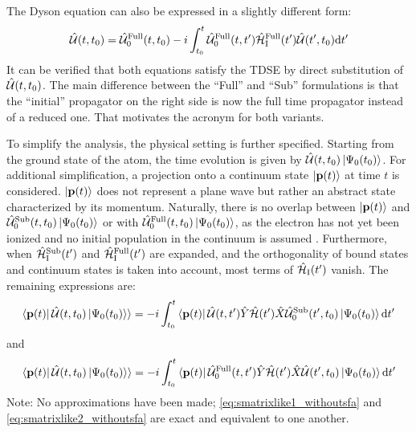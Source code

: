 The Dyson equation can also be expressed in a slightly different form:
\begin{equation}
    \hat{\mathcal{U}}(t,t_0)=\hat{\mathcal{U}}^{\mathrm{Full}}_0(t,t_0)-i\int_{t_0}^{t} \hat{\mathcal{U}}^{\mathrm{Full}}_0(t,t')\hat{\mathcal{H}}^{\mathrm{Full}}_{\mathrm{I}}(t')\hat{\mathcal{U}}(t',t_0) \mathrm{d} t'       \label{eq:dysonAnsatztRecX}
\end{equation}
It can be verified that both equations satisfy the TDSE by direct substitution of $\hat{\mathcal{U}}(t,t_0)$.
The main difference between the ``Full'' and ``Sub'' formulations is that the ``initial'' propagator on the right side is now the full time propagator instead of a reduced one.
That motivates the acronym for both variants.

To simplify the analysis, the physical setting is further specified.
Starting from the ground state of the atom, the time evolution is given by $\hat{\mathcal{U}}(t,t_0)\ket{\Psi_0(t_0)}$.
For additional simplification, a projection onto a continuum state $\ket{\mathbf{p}(t)}$ at time $t$ is considered.
$\ket{\mathbf{p}(t)}$ does not represent a plane wave but rather an abstract state characterized by its momentum.
Naturally, there is no overlap between $\ket{\mathbf{p}(t)}$ and $\hat{\mathcal{U}}^{\mathrm{Sub}}_0(t,t_0)\ket{\Psi_0(t_0)}$ or with $\hat{\mathcal{U}}^{\mathrm{Full}}_0(t,t_0)\ket{\Psi_0(t_0)}$, as the electron has not yet been ionized and no initial population in the continuum is assumed \cite{Ivanov20012005}.
Furthermore, when $\hat{\mathcal{H}}^{\mathrm{Sub}}_{\mathrm{I}}(t')$ and $\hat{\mathcal{H}}^{\mathrm{Full}}_{\mathrm{I}}(t')$ are expanded, and the orthogonality of bound states and continuum states is taken into account, most terms of $\hat{\mathcal{H}}_{\mathrm{I}}(t')$ vanish.
The remaining expressions are:
\begin{equation}
    \braket{\mathbf{p}(t)|\,\hat{\mathcal{U}}(t,t_0)\ket{\Psi_0(t_0)}} = -i \int_{t_0}^{t} \bra{\mathbf{p}(t)} \hat{\mathcal{U}}(t,t')\hat{Y}\hat{\mathcal{H}}(t')\hat{X} \hat{\mathcal{U}}^{\mathrm{Sub}}_0(t',t_0)\ket{\Psi_0(t_0)} \mathrm{d} t' \label{eq:smatrixlike1_withoutsfa}
\end{equation}
and
\begin{equation}
    \braket{\mathbf{p}(t)|\,\hat{\mathcal{U}}(t,t_0)\ket{\Psi_0(t_0)}} = -i \int_{t_0}^{t} \bra{\mathbf{p}(t)} \hat{\mathcal{U}}^{\mathrm{Full}}_0(t,t')\hat{Y}\hat{\mathcal{H}}(t')\hat{X} \hat{\mathcal{U}}(t',t_0)\ket{\Psi_0(t_0)} \mathrm{d} t' \label{eq:smatrixlike2_withoutsfa}
\end{equation}
Note: No approximations have been made; \eqref{eq:smatrixlike1_withoutsfa} and \eqref{eq:smatrixlike2_withoutsfa} are exact and equivalent to one another.













